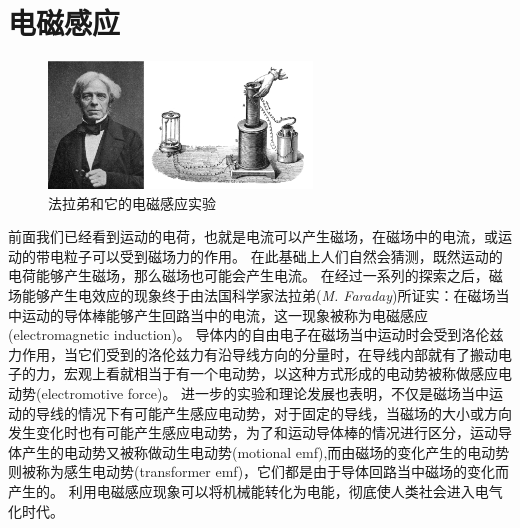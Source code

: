  
 \chapter{电磁感应}
 \begin{figure}
 \includegraphics[width=7cm]{images/mag-3.pdf} 
 \caption{法拉弟和它的电磁感应实验}
 \end{figure}
前面我们已经看到运动的电荷，也就是电流可以产生磁场，在磁场中的电流，或运动的带电粒子可以受到磁场力的作用。
在此基础上人们自然会猜测，既然运动的电荷能够产生磁场，那么磁场也可能会产生电流。
在经过一系列的探索之后，磁场能够产生电效应的现象终于由法国科学家法拉弟({\it M. Faraday})所证实：在磁场当中运动的导体棒能够产生回路当中的电流，这一现象被称为{\heiti 电磁感应}(electromagnetic induction)。
导体内的自由电子在磁场当中运动时会受到洛伦兹力作用，当它们受到的洛伦兹力有沿导线方向的分量时，在导线内部就有了搬动电子的力，宏观上看就相当于有一个电动势，以这种方式形成的电动势被称做{\heiti 感应电动势}(electromotive force)。
进一步的实验和理论发展也表明，不仅是磁场当中运动的导线的情况下有可能产生感应电动势，对于固定的导线，当磁场的大小或方向发生变化时也有可能产生感应电动势，为了和运动导体棒的情况进行区分，运动导体产生的电动势又被称做{\heiti 动生电动势}(motional emf),而由磁场的变化产生的电动势则被称为{\heiti 感生电动势}(transformer emf)，它们都是由于导体回路当中磁场的变化而产生的。
利用电磁感应现象可以将机械能转化为电能，彻底使人类社会进入电气化时代。

 
 
 

